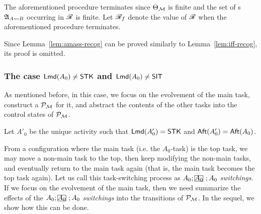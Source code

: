 \medskip

The aforementioned procedure terminates since $\Theta_{\mathcal{M} }$ is finite and the set of {\NFA}s ${\mathfrak{A} }_{A\rightsquigarrow B}$ occurring in $\mathscr{R}$ is finite.
Let $\mathscr{R}_f$ denote the value of $\mathscr{R}$ when the aforementioned procedure terminates. 

Since Lemma~\ref{lem:amass-recog} can be proved similarly to Lemma~\ref{lem:iff-recog}, its proof is omitted. 

\subsubsection{The case ${\sf Lmd}(A_0) \neq \mathsf{STK}$ and ${\sf Lmd}(A_0) \neq \mathsf{SIT}$}\label{sec:amass-nostk}

As mentioned before, in this case, we focus on the evolvement of the main task, construct a {\WOTrPDS} ${\mathcal{P} }_{{\mathcal{M} }}$ for it, and abstract the contents of the other tasks into the control states of ${\mathcal{P} }_{{\mathcal{M} }}$. 

Let $A'_0$ be the unique activity such that ${\sf Lmd}(A'_0) = {\sf STK}$ and ${\sf Aft}(A'_0) = {\sf Aft}(A_0)$.  

From a configuration where the main task (i.e. the $A_0$-task) is the top task, we may move a non-main task to the top, then keep modifying the non-main tasks, and eventually return to the main task again (that is, the main task becomes the top task again). Let us call this task-switching process as $A_0;\mhcancel{A_0};A_0$ \emph{switchings}. If we focus on the evolvement of the main task, then we need summarize the effects of the $A_0;\mhcancel{A_0};A_0$ \emph{switchings} into the transitions of ${\mathcal{P} }_{{\mathcal{M} }}$.
In the sequel, we show how this can be done. 

